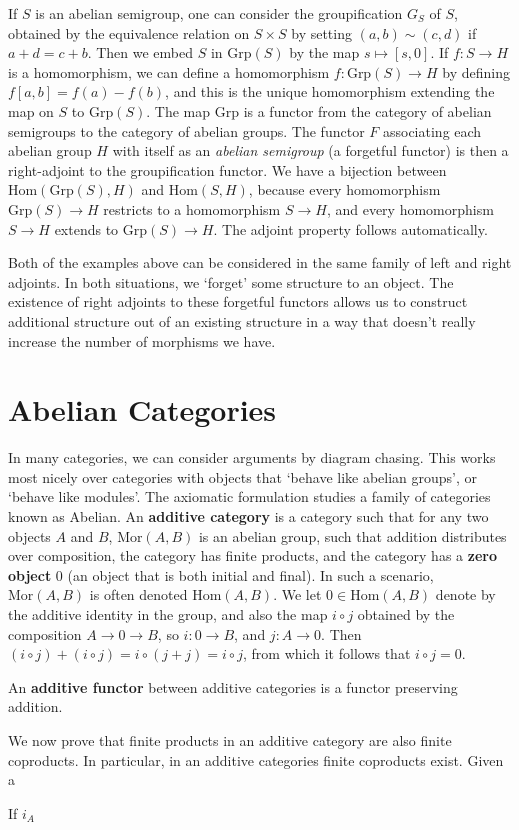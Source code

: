 \begin{example}
    If $S$ is an abelian semigroup, one can consider the groupification $G_S$ of $S$, obtained by the equivalence relation on $S \times S$ by setting $(a,b) \sim (c,d)$ if $a + d = c + b$. Then we embed $S$ in $\text{Grp}(S)$ by the map $s \mapsto [s,0]$. If $f: S \to H$ is a homomorphism, we can define a homomorphism $f: \text{Grp}(S) \to H$ by defining $f[a,b] = f(a) - f(b)$, and this is the unique homomorphism extending the map on $S$ to $\text{Grp}(S)$. The map $\text{Grp}$ is a functor from the category of abelian semigroups to the category of abelian groups. The functor $F$ associating each abelian group $H$ with itself as an {\it abelian semigroup} (a forgetful functor) is then a right-adjoint to the groupification functor. We have a bijection between $\text{Hom}(\text{Grp}(S),H)$ and $\text{Hom}(S,H)$, because every homomorphism $\text{Grp}(S) \to H$ restricts to a homomorphism $S \to H$, and every homomorphism $S \to H$ extends to $\text{Grp}(S) \to H$. The adjoint property follows automatically.
\end{example}

Both of the examples above can be considered in the same family of left and right adjoints. In both situations, we `forget' some structure to an object. The existence of right adjoints to these forgetful functors allows us to construct additional structure out of an existing structure in a way that doesn't really increase the number of morphisms we have.

\chapter{Abelian Categories}

In many categories, we can consider arguments by diagram chasing. This works most nicely over categories with objects that `behave like abelian groups', or `behave like modules'. The axiomatic formulation studies a family of categories known as Abelian. An {\bf additive category} is a category such that for any two objects $A$ and $B$, $\text{Mor}(A,B)$ is an abelian group, such that addition distributes over composition, the category has finite products, and the category has a {\bf zero object} $0$ (an object that is both initial and final). In such a scenario, $\text{Mor}(A,B)$ is often denoted $\text{Hom}(A,B)$. We let $0 \in \text{Hom}(A,B)$ denote by the additive identity in the group, and also the map $i \circ j$ obtained by the composition $A \to 0 \to B$, so $i: 0 \to B$, and $j: A \to 0$. Then $(i \circ j) + (i \circ j) = i \circ (j + j) = i \circ j$, from which it follows that $i \circ j = 0$.

An {\bf additive functor} between additive categories is a functor preserving addition.

We now prove that finite products in an additive category are also finite coproducts. In particular, in an additive categories finite coproducts exist. Given a 

\begin{lemma}
    If $i_A$
\end{lemma}

